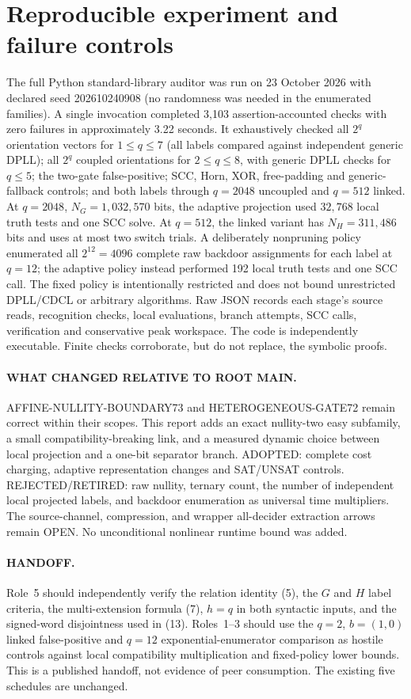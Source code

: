 \documentclass[11pt]{article}
\begin{document}
\section{Reproducible experiment and failure controls}
The full Python standard-library auditor
 was run on 23 October 2026
with declared seed 202610240908 (no randomness
was needed in the enumerated families).
A single invocation completed 3,103 assertion-accounted
checks with zero failures in approximately 3.22 seconds.
It exhaustively checked all $2^q$ orientation vectors
for $1\le q\le7$ (all labels compared against independent
generic DPLL); all $2^q$ coupled orientations for
$2\le q\le8$, with generic DPLL checks for $q\le5$;
the two-gate false-positive; SCC, Horn, XOR, free-padding
and generic-fallback controls; and both labels through
$q=2048$ uncoupled and $q=512$ linked.
At $q=2048$, $N_G=1{,}032{,}570$ bits, the adaptive
projection used $32{,}768$ local truth tests and one
SCC solve. At $q=512$, the linked variant has
$N_H=311{,}486$ bits and uses at most two switch trials.
A deliberately nonpruning policy enumerated all
$2^{12}=4096$ complete raw backdoor assignments for
each label at $q=12$; the adaptive policy instead
performed 192 local truth tests and one SCC call.
The fixed policy is intentionally restricted and does
not bound unrestricted DPLL/CDCL or arbitrary algorithms.
Raw JSON records each stage's source reads,
recognition checks, local evaluations, branch attempts,
SCC calls, verification and conservative peak workspace.
The code is independently executable. Finite checks
corroborate, but do not replace, the symbolic proofs.

\paragraph{WHAT CHANGED RELATIVE TO ROOT MAIN.}
AFFINE-NULLITY-BOUNDARY73 and HETEROGENEOUS-GATE72
remain correct within their scopes. This report
adds an exact nullity-two easy subfamily, a small
compatibility-breaking link, and a measured dynamic
choice between local projection and a one-bit
separator branch. ADOPTED: complete cost charging,
adaptive representation changes and SAT/UNSAT controls.
REJECTED/RETIRED: raw nullity, ternary count,
the number of independent local projected labels, and
backdoor enumeration as universal time multipliers.
The source-channel, compression, and wrapper
all-decider extraction arrows remain OPEN.
No unconditional nonlinear runtime bound was added.

\paragraph{HANDOFF.}
Role~5 should independently verify the relation
identity (5), the $G$ and $H$ label criteria, the
multi-extension formula (7), $h=q$ in both syntactic
inputs, and the signed-word disjointness used in (13).
Roles~1--3 should use the $q=2$, $b=(1,0)$ linked
false-positive and $q=12$ exponential-enumerator
comparison as hostile controls against local
compatibility multiplication and fixed-policy
lower bounds. This is a published handoff, not
evidence of peer consumption. The existing five
schedules are unchanged.
\end{document}
